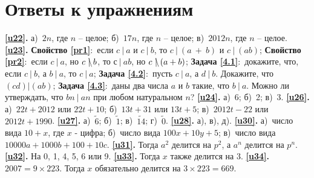 \section{Ответы к упражнениям}
\textbf{\ref{u22}.} а)~$2n$, где $n$ – целое; б)~$17n$, где $n$ – целое; в)~$2012n$, где $n$ – целое. 
\textbf{\ref{u23}.} \textbf{Свойство \ref{pr1}}:~если $c~|~a$  и $c~|~b$, то $c~|~(a~+~b)$ и $c~|~(ab)$; \textbf{Свойство \ref{pr2}}:~если $c~|~a$, но $c~\mathrlap{\backslash}|~b$, то $с~|~ab$, но $c~\mathrlap{\backslash}|~(a+b)$; \textbf{Задача \ref{4.1}}:~докажите, что, если $c~|~b$, а $b~|~a$, то $c~|~a$; \textbf{Задача \ref{4.2}}:~пусть $c~|~a$, а $d~|~b$. Докажите, что $(cd)|(ab)$; \textbf{Задача \ref{4.3}}:~даны два числа $a$ и $b$ такие, что $b~|~a$. Можно ли утверждать, что $bn~|~an$ при любом натуральном $n$? 
\textbf{\ref{u24}.} а)~6; б)~2; в)~3.
\textbf{\ref{u26}.} а)~$22t+2012$ или $22t+10$; б)~$13t+31$ или $13t+5$; в)~$2012t-22$ или $2012t+1990$.
\textbf{\ref{u27}.} а)~$\tilde{6}$; б)~$\tilde{1}$; в)~$\tilde{14}$; г)~$\tilde{0}$.
\textbf{\ref{u28}.} а), в), д).
\textbf{\ref{u30}.} а)~число вида $10+x$, где $x$ - цифра; б)~число вида $100x+10y+5$; в)~число вида $10000a + 1000b + 100 + 10c$.
\textbf{\ref{u31}.} Тогда $a^2$ делится на $p^2$, а $a^n$ делится на $p^n$. 
\textbf{\ref{u32}.} На 0, 1, 4, 5, 6 или 9. 
\textbf{\ref{u33}.} Тогда $x$ также делится на 3.
\textbf{\ref{u34}.} $2007 = 9 \times 223$. Тогда $x$ обязательно делится на $3 \times 223 = 669$.